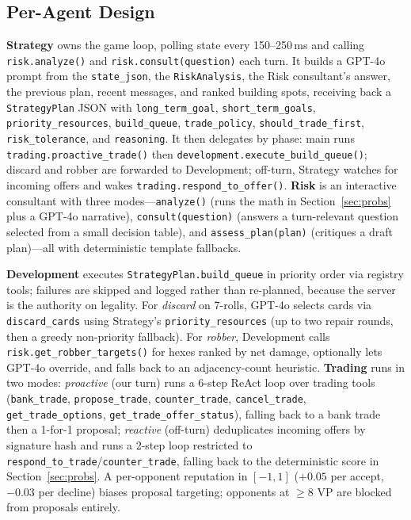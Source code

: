 \documentclass{article} %
\begin{document}
\subsection{Per-Agent Design}
\label{sec:agents}

\textbf{Strategy} owns the game loop, polling state every 150--250\,ms and calling \texttt{risk.analyze()} and \texttt{risk.consult(question)} each turn. It builds a GPT-4o prompt from the \texttt{state\_json}, the \texttt{RiskAnalysis}, the Risk consultant's answer, the previous plan, recent messages, and ranked building spots, receiving back a \texttt{StrategyPlan} JSON with \texttt{long\_term\_goal}, \texttt{short\_term\_goals}, \texttt{priority\_resources}, \texttt{build\_queue}, \texttt{trade\_policy}, \texttt{should\_trade\_first}, \texttt{risk\_tolerance}, and \texttt{reasoning}. It then delegates by phase: main runs \texttt{trading.proactive\_trade()} then \texttt{development.execute\_build\_queue()}; discard and robber are forwarded to Development; off-turn, Strategy watches for incoming offers and wakes \texttt{trading.respond\_to\_offer()}. \textbf{Risk} is an interactive consultant with three modes---\texttt{analyze()} (runs the math in Section~\ref{sec:probs} plus a GPT-4o narrative), \texttt{consult(question)} (answers a turn-relevant question selected from a small decision table), and \texttt{assess\_plan(plan)} (critiques a draft plan)---all with deterministic template fallbacks.

\textbf{Development} executes \texttt{StrategyPlan.build\_queue} in priority order via registry tools; failures are skipped and logged rather than re-planned, because the server is the authority on legality. For \emph{discard} on 7-rolls, GPT-4o selects cards via \texttt{discard\_cards} using Strategy's \texttt{priority\_resources} (up to two repair rounds, then a greedy non-priority fallback). For \emph{robber}, Development calls \texttt{risk.get\_robber\_targets()} for hexes ranked by net damage, optionally lets GPT-4o override, and falls back to an adjacency-count heuristic. \textbf{Trading} runs in two modes: \emph{proactive} (our turn) runs a 6-step ReAct loop over trading tools (\texttt{bank\_trade}, \texttt{propose\_trade}, \texttt{counter\_trade}, \texttt{cancel\_trade}, \texttt{get\_trade\_options}, \texttt{get\_trade\_offer\_status}), falling back to a bank trade then a 1-for-1 proposal; \emph{reactive} (off-turn) deduplicates incoming offers by signature hash and runs a 2-step loop restricted to \texttt{respond\_to\_trade}/\texttt{counter\_trade}, falling back to the deterministic score in Section~\ref{sec:probs}. A per-opponent reputation in $[-1,1]$ ($+0.05$ per accept, $-0.03$ per decline) biases proposal targeting; opponents at $\geq 8$ VP are blocked from proposals entirely.
\end{document}
